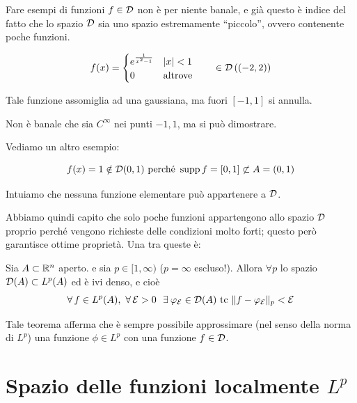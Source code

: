 \begin{exa}
Fare esempi di funzioni $f\in\mathcal{D}$ non è per niente banale, e già questo è indice del fatto che lo spazio $\mathcal{D}$ sia uno spazio estremamente ``piccolo'', ovvero contenente poche funzioni.

\begin{equation*}
f(x)=\begin{cases}
e^{\frac{1}{x^2-1}} &|x|<1 \\
0 &\text{altrove}
\end{cases}
\qquad \in \mathcal{D}\left((-2,2)\right)
\end{equation*}


Tale funzione assomiglia ad una gaussiana, ma fuori $[-1,1]$ si annulla.

Non è banale che sia $C^{\infty}$ nei punti $ - 1, 1$, ma si può dimostrare.

Vediamo un altro esempio:

\begin{equation*}
f(x)=1\notin\mathcal{D}(0,1)\text{ perché }\operatorname*{supp} f=[0,1]\not\subset A=(0,1)
\end{equation*}

Intuiamo che nessuna funzione elementare può appartenere a $\mathcal{D}$.

\end{exa}

Abbiamo quindi capito che solo poche funzioni appartengono allo spazio $\mathcal{D}$ proprio perché vengono richieste delle condizioni molto forti; questo però garantisce ottime proprietà. Una tra queste è:

\begin{thm}
\label{teo_denso}
Sia $A\subset \mathbb{R}^n$ aperto. e sia $p\in[1,\infty)$ ($p=\infty$ escluso!). Allora $\forall p$ lo spazio $\mathcal{D}(A)\subset L^p(A)$ ed è ivi denso, e cioè
\begin{equation*}
\forall f\in L^p(A),\ \forall \Ec>0\ \ \exists\varphi_\Ec\in\Dc(A)\ \text{tc}\ \Vert f-\varphi_\Ec\Vert_p<\Ec
\end{equation*}
\end{thm}
Tale teorema afferma che è sempre possibile approssimare (nel senso della norma di $L^p$) una funzione $\phi\in L^p$ con una funzione $f\in\mathcal{D}$.


\section{Spazio delle funzioni localmente \texorpdfstring{$L^p$}{C}}

